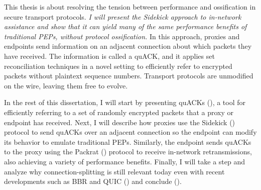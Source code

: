 This thesis is about resolving the tension between performance and ossification
in secure transport protocols. \textit{I will present the
Sidekick approach to in-network assistance and show that it can yield many of
the same performance benefits of traditional PEPs, without protocol
ossification.} In this approach, proxies and endpoints send information on an
adjacent connection about which packets they have received. The information is
called a quACK, and it applies set reconciliation techniques in a novel setting
to efficiently refer to encrypted packets without plaintext sequence numbers.
Transport protocols are unmodified on the wire, leaving them free to evolve.

In the rest of this dissertation, I will start by presenting quACKs
(), a tool for efficiently referring to a set of randomly
encrypted packets that a proxy or endpoint has received. Next, I will describe
how proxies use the Sidekick () protocol to send quACKs over
an adjacent connection so the endpoint can modify its behavior to emulate
traditional PEPs. Similarly, the endpoint sends quACKs to the proxy using the
Packrat () protocol to receive in-network retransmissions,
also achieving a variety of performance benefits. Finally, I will take a step
and analyze why connection-splitting is still relevant today even with recent
developments such as BBR and QUIC () and conclude
().





